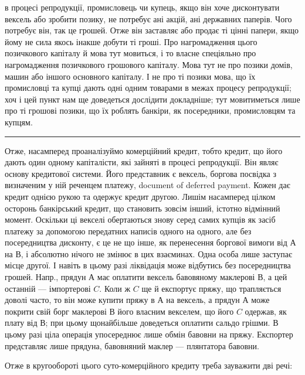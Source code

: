 \parcont{}  %
в процесі репродукції, промисловець чи купець, якщо він хоче дисконтувати
вексель або зробити позику, не потребує ані акцій, ані державних паперів. Чого
потребує він, так це грошей. Отже він заставляє або продає ті цінні папери, якщо
йому не сила якось інакше добути ті гроші. Про нагромадження цього позичкового
капіталу й мова тут мовиться, і то власне спеціяльно про нагромадження позичкового
грошового капіталу. Мова тут не про позики домів, машин або іншого
основного капіталу. І не про ті позики мова, що їх промисловці та купці дають
одні одним товарами в межах процесу репродукції; хоч і цей пункт нам ще
доведеться дослідити докладніше; тут мовитиметься лише про ті грошові позики,
що їх роблять банкіри, як посередники, промисловцям та купцям.

\pfbreak

Отже, насамперед проаналізуймо комерційний кредит, тобто кредит, що його
дають один одному капіталісти, які зайняті в процесі репродукції. Він являє
основу кредитової системи. Його представник є вексель, боргова посвідка з визначеним
у ній реченцем платежу, document of deferred payment. Кожен дає кредит
однією рукою та одержує кредит другою. Лишім насамперед цілком осторонь банкірський
кредит, що становить зовсім інший, істотно відмінний момент. Оскільки ці
векселі обертаються знову серед самих купців як засіб платежу за допомогою
передатних написів одного на одного, але без посередництва дисконту, є це не
що інше, як перенесення боргової вимоги від $А$ на $В$, і абсолютно нічого не
змінює в цих взаєминах. Одна особа лише заступає місце другої. І навіть
в цьому разі ліквідація може відбутись без посередництва грошей. Напр., прядун
$А$ має оплатити вексель бавовяному маклерові $В$, а цей останній — імпортерові $C$.
Коли ж $C$ ще й експортує пряжу, що трапляється доволі часто, то він може
купити пряжу в $А$ на вексель, а прядун $А$ може покрити свій борг маклерові $В$
його власним векселем, що його $C$ одержав, як плату від $В$; при цьому щонайбільше
доведеться оплатити сальдо грішми. В цьому разі ціла операція
упосереднює лише обмін бавовни на пряжу. Експортер представляє лише прядуна,
бавовняний маклер — плянтатора бавовни.

Отже в кругообороті цього суто-комерційного кредиту треба зауважити дві речі:

